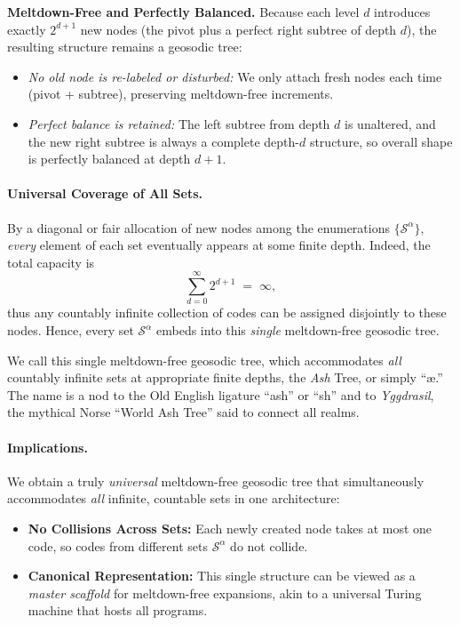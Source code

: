 \noindent
\textbf{Meltdown-Free and Perfectly Balanced.}
Because each level $d$ introduces exactly $2^{d+1}$ new nodes (the pivot plus a perfect right subtree of depth $d$),
the resulting structure remains a geosodic tree:
\begin{itemize}
    \item \emph{No old node is re-labeled or disturbed:} We only attach fresh nodes 
    each time (pivot + subtree), preserving meltdown-free increments.
    \item \emph{Perfect balance is retained:} The left subtree from depth $d$ 
    is unaltered, and the new right subtree is always a complete depth-$d$ structure, 
    so overall shape is perfectly balanced at depth $d+1$.
\end{itemize}

\paragraph{Universal Coverage of All Sets.}
By a diagonal or fair allocation of new nodes among the enumerations $\{\mathcal{S}^\alpha\}$, 
\emph{every} element of each set eventually appears at some finite depth. 
Indeed, the total capacity is
\[
  \sum_{d=0}^{\infty} 2^{d+1} \;=\; \infty,
\]
thus any countably infinite collection of codes can be assigned disjointly to these nodes. 
Hence, every set $\mathcal{S}^\alpha$ embeds into this \emph{single} meltdown-free geosodic tree.

\begin{definition}
    \label{def:universal-ash}
    We call this single meltdown-free geosodic tree, which accommodates
    \emph{all} countably infinite sets at appropriate finite depths,
    the \emph{Ash} Tree, or simply ``\ae.'' The name is a nod to the 
    Old English ligature “ash” or “\text{\ae}sh” and to \emph{Yggdrasil}, 
    the mythical Norse ``World Ash Tree'' said to connect all realms.
    \end{definition}

\paragraph{Implications.}
We obtain a truly \emph{universal} meltdown-free geosodic tree 
that simultaneously accommodates \emph{all} infinite, countable sets in one architecture:
\begin{itemize}
    \item \textbf{No Collisions Across Sets:} Each newly created node takes at most one code,
    so codes from different sets $\mathcal{S}^\alpha$ do not collide.
    \item \textbf{Canonical Representation:} This single structure 
    can be viewed as a \emph{master scaffold} for meltdown-free expansions, 
    akin to a universal Turing machine that hosts all programs.
\end{itemize}

